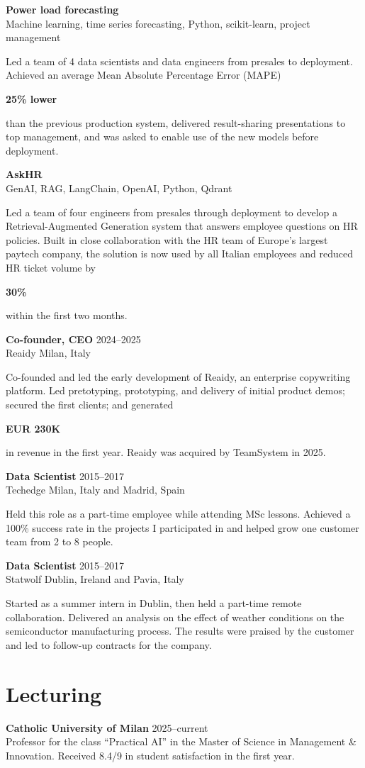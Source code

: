 \documentclass[10pt,a4paper]{article}
\newcommand{\role}[4]{%
  \textbf{#1} \hfill #2\\
  {\color{textgray}#3 \hfill #4}\par
}
\newcommand{\project}[2]{%
  \textbf{#1}\\[-1pt]
  {\color{textgray}#2}\par
}
\newcommand{\metric}[1]{\colorbox{softaccent}{\strut\textbf{#1}}}
\begin{document}
\vspace{3pt}
\project{Power load forecasting}{Machine learning, time series forecasting, Python, scikit-learn, project management}
Led a team of 4 data scientists and data engineers from presales to deployment. Achieved an average Mean Absolute Percentage Error (MAPE) \metric{25\% lower} than the previous production system, delivered result-sharing presentations to top management, and was asked to enable use of the new models before deployment.

\vspace{3pt}
\project{AskHR}{GenAI, RAG, LangChain, OpenAI, Python, Qdrant}
Led a team of four engineers from presales through deployment to develop a Retrieval-Augmented Generation system that answers employee questions on HR policies. Built in close collaboration with the HR team of Europe's largest paytech company, the solution is now used by all Italian employees and reduced HR ticket volume by \metric{30\%} within the first two months.

\vspace{5pt}
\role{Co-founder, CEO}{2024--2025}{Reaidy}{Milan, Italy}
Co-founded and led the early development of Reaidy, an enterprise copywriting platform. Led pretotyping, prototyping, and delivery of initial product demos; secured the first clients; and generated \metric{EUR 230K} in revenue in the first year. Reaidy was acquired by TeamSystem in 2025.

\vspace{5pt}
\role{Data Scientist}{2015--2017}{Techedge}{Milan, Italy and Madrid, Spain}
Held this role as a part-time employee while attending MSc lessons. Achieved a 100\% success rate in the projects I participated in and helped grow one customer team from 2 to 8 people.

\vspace{5pt}
\role{Data Scientist}{2015--2017}{Statwolf}{Dublin, Ireland and Pavia, Italy}
Started as a summer intern in Dublin, then held a part-time remote collaboration. Delivered an analysis on the effect of weather conditions on the semiconductor manufacturing process. The results were praised by the customer and led to follow-up contracts for the company.

\section*{Lecturing}
\textbf{Catholic University of Milan} \hfill 2025--current\\
Professor for the class ``Practical AI'' in the Master of Science in Management \& Innovation. Received 8.4/9 in student satisfaction in the first year.
\end{document}
